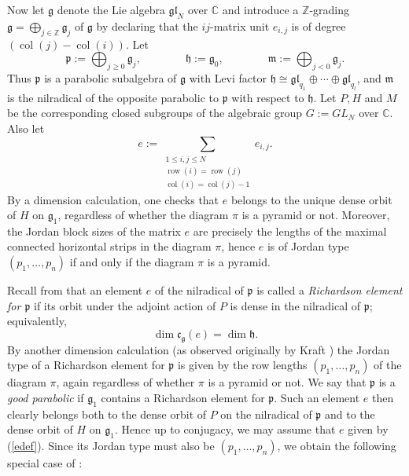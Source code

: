 \documentclass[twoside,12pt,reqno]{amsart}
\def\row{\operatorname{row}}
\def\col{\operatorname{col}}
\def\C{{\mathbb C}}
\def\Z{{\mathbb Z}}
\begin{document}
Now let $\mathfrak{g}$ denote the Lie algebra $\mathfrak{gl}_N$
over $\C$ and
introduce a $\Z$-grading $\mathfrak{g} = 
\bigoplus_{j \in \Z} \mathfrak{g}_j$ of $\mathfrak{g}$
by declaring that
the $ij$-matrix unit $e_{i,j}$ is of degree $(\col(j)-\col(i))$.
Let
\begin{equation}\label{Ac1}
\mathfrak{p} := \bigoplus_{j \geq 0} \mathfrak{g}_j,\qquad\qquad
\mathfrak{h} := \mathfrak{g}_0,\qquad\qquad
\mathfrak{m} := \bigoplus_{j < 0} \mathfrak{g}_j.
\end{equation}
Thus $\mathfrak{p}$ is a parabolic subalgebra of $\mathfrak{g}$
with Levi factor $\mathfrak{h}
\cong \mathfrak{gl}_{q_1}\oplus\cdots\oplus\mathfrak{gl}_{q_l}$,
and $\mathfrak{m}$
is the nilradical of the opposite parabolic to $\mathfrak{p}$
with respect to $\mathfrak{h}$. 
Let $P, H$ and $M$ be the corresponding closed subgroups of 
the algebraic group $G := GL_N$ over $\C$.
Also let
\begin{equation}\label{edef}
e := \sum_{\substack{1 \leq i,j \leq N \\ \row(i) = \row(j)\\ \col(i)= \col(j)-1}} e_{i,j}.
\end{equation}
By a dimension calculation, one checks that
$e$ belongs to the unique dense orbit of $H$ on $\mathfrak{g}_1$,
regardless of whether the diagram $\pi$ is a pyramid or not.
Moreover, the Jordan block sizes of the matrix $e$ are 
precisely
the lengths of the maximal connected horizontal strips in the
diagram $\pi$, hence $e$ is of Jordan type
$(p_1,\dots,p_n)$ if and only if the diagram $\pi$ is a pyramid.

Recall from \cite[$\S$5.2]{Carter} that an element
$e$ of the nilradical of $\mathfrak{p}$ is called
a {\em Richardson element for $\mathfrak{p}$} if its orbit
under the adjoint action of $P$
is dense in the nilradical of $\mathfrak{p}$;
equivalently,
\begin{equation}\label{rp}
\dim \mathfrak{c}_{\mathfrak{g}}(e) = \dim \mathfrak{h}.
\end{equation}
By another dimension calculation (as observed originally by
Kraft \cite{Kr}) the Jordan type
of a Richardson element for $\mathfrak{p}$ is 
given by the row lengths $(p_1,\dots,p_n)$ of the diagram $\pi$,
again regardless of whether $\pi$ is a pyramid or not.
We say that $\mathfrak{p}$ is a {\em good parabolic}
if $\mathfrak{g}_1$ contains a Richardson element for $\mathfrak{p}$.
Such an element $e$ then clearly belongs both to the
dense orbit of $P$ on the nilradical of $\mathfrak{p}$
and to the dense orbit of $H$ on $\mathfrak{g}_1$.
Hence up to conjugacy, we may assume that $e$ given
by (\ref{edef}). Since its Jordan type must also be
$(p_1,\dots,p_n)$, we obtain the following 
special case of \cite[Lemma 7.2]{Ly}:
\end{document}

